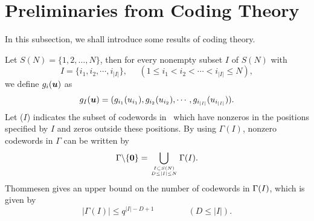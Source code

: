 \section{Preliminaries from Coding Theory}
In this subsection, we shall introduce some results of coding theory.

Let $S(N)=\{ 1,2,\ldots ,N\}$, then for every nonempty subset $I$ of
$S(N)$ with
\[
I = \{ i_1,i_2, \cdots ,i_{|I|} \},\;\;\;\;\;(1 \leq i_1 < i_2 < \cdots <
i_{|I|
}
\leq N),
\]
we define $g_i(\mbox{\boldmath $u$})$ as
\[
\begin{array}{l}
g_I(\mbox{\boldmath $u$})=(g_{i_1}(u_{i_1}),g_{i_2}(u_{i_2}),\cdots
,g_{i_{|I|}}(u_{i_{|I|}})).
\end{array}
\]
Let \g($I$) indicates the subset of codewords in \g\ which
have nonzeros in the positions specified by $I$ and zeros outside these
positions. By using $\Gamma(I)$, nonzero codewords in $\Gamma$ can be
written by
\begin{equation}
 \Gamma\backslash\{\mbox{\boldmath{$0$}}\}=
  \bigcup_{I\subset S(N) \atop D\le |I|\le N}\Gamma(I).
\label{gi}
\end{equation}
Thommesen \cite{th} gives an upper bound on the 
number of codewords in $\mbox{$\Gamma$}(I)$, which is given by
\begin{equation}
 |\Gamma(I)| \leq q^{|I|-D+1} \qquad \qquad (D\leq |I|).
\label{gam}
\end{equation}
%

